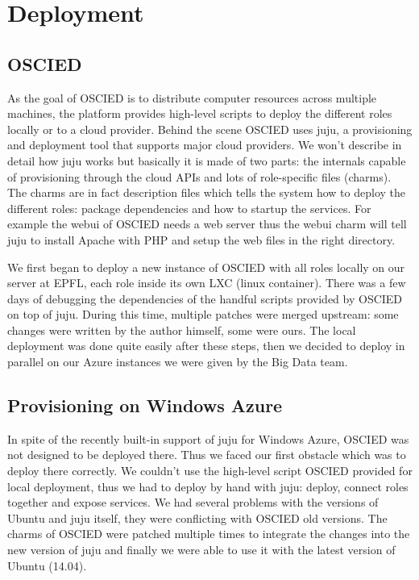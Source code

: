 \documentclass[a4paper,12pt]{article}
\begin{document}

\section{Deployment}
\subsection{OSCIED}
As the goal of OSCIED is to distribute computer resources across multiple
machines, the platform provides high-level scripts to deploy the different roles
locally or to a cloud provider.  Behind the scene OSCIED uses juju, a
provisioning and deployment tool that supports major cloud providers.  We won't
describe in detail how juju works but basically it is made of two parts: the
internals capable of provisioning through the cloud APIs and lots of
role-specific files (charms).  The charms are in fact description files which
tells the system how to deploy the different roles: package dependencies and how
to startup the services.  For example the webui of OSCIED needs a web server
thus the webui charm will tell juju to install Apache with PHP and setup the web
files in the right directory.

We first began to deploy a new instance of OSCIED with all roles locally on our
server at EPFL, each role inside its own LXC (linux container).  There was a few
days of debugging the dependencies of the handful scripts provided by OSCIED on
top of juju.  During this time, multiple patches were merged upstream: some
changes were written by the author himself, some were ours.  The local
deployment was done quite easily after these steps, then we decided to deploy in
parallel on our Azure instances we were given by the Big Data team.

\subsection{Provisioning on Windows Azure}
In spite of the recently built-in support of juju for Windows Azure, OSCIED was
not designed to be deployed there.  Thus we faced our first obstacle which was
to deploy there correctly.  We couldn't use the high-level script OSCIED
provided for local deployment, thus we had to deploy by hand with juju: deploy,
connect roles together and expose services.  We had several problems with the
versions of Ubuntu and juju itself, they were conflicting with OSCIED old
versions.  The charms of OSCIED were patched multiple times to integrate the
changes into the new version of juju and finally we were able to use it with the
latest version of Ubuntu (14.04).
\end{document}
